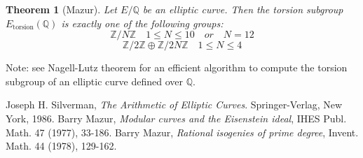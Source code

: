 \documentclass[12pt]{article}
\newtheorem{thm}{Theorem}
\newcommand{\Ints}{\mathbb{Z}}
\newcommand{\Rats}{\mathbb{Q}}
\begin{document}
\begin{thm}[Mazur]
Let $E/\Rats$ be an elliptic curve. Then the torsion subgroup
$E_{\operatorname{torsion}}(\Rats)$ is exactly one of the
following groups:
$$\Ints/N\Ints \quad 1\leq N \leq 10\quad or\quad N=12$$
$$\Ints /2 \Ints \oplus \Ints / 2N \Ints \quad 1\leq N\leq 4$$
\end{thm}

Note: see Nagell-Lutz theorem for an efficient algorithm to compute the torsion subgroup of an elliptic curve defined over $\Rats$.

\begin{thebibliography}{9}
 Joseph H. Silverman, {\em The Arithmetic of Elliptic Curves}. Springer-Verlag, New York, 1986.
 Barry Mazur, {\em Modular curves and the
Eisenstein ideal}, IHES Publ. Math. 47 (1977), 33-186.
 Barry Mazur, {\em Rational isogenies of prime
degree}, Invent. Math. 44 (1978), 129-162.
\end{thebibliography}
\end{document}
